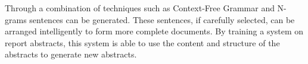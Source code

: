 \documentclass[letterpaper, 10 pt, conference]{ieeeconf}  %
\begin{document}
Through a combination of techniques such as Context-Free Grammar and N-grams sentences can be generated. These sentences, if carefully selected, can be arranged intelligently to form more complete documents. By training a system on report abstracts, this system is able to use the content and structure of the abstracts to generate new abstracts.


\addtolength{\textheight}{-12cm}   %

























\end{document}
